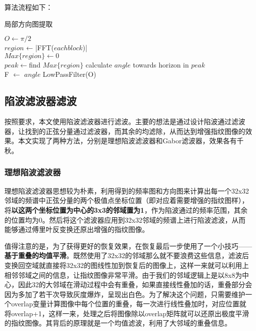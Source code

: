 \documentclass[UTF8]{ctexart}
\begin{document}
算法流程如下：

\begin{algorithm}[H]
    \caption{局部方向图提取}
    {
        $O \leftarrow \pi/2$\\
        $region$ ← |FFT($eachblock$)|\\
        $Max\{region\} \leftarrow  0$ \\
        {
            $peak \leftarrow $find $Max\{region\}$
        }
        calculate $angle$ towards horizon in $peak$ \\
        F $\leftarrow$ $angle$
    }
    LowPassFilter(O)

\end{algorithm}

\subsection{陷波滤波器滤波}
按照要求，本文使用陷波滤波器进行滤波。主要的想法是通过设计陷波通过滤波器，让找到的正弦分量通过滤波器，而其余的均滤除，从而达到增强指纹图像的效果。本文实现了两种方法，分别是理想陷波滤波器和Gabor滤波器，效果各有千秋。

\subsubsection{理想陷波滤波器}
理想陷波滤波器思想较为朴素，利用得到的频率图和方向图来计算出每一个32x32邻域的频谱中正弦分量的两个极值点坐标位置（即对应着需要增强的指纹图样），将\textbf{以这两个坐标位置为中心的3x3的邻域置为1}，作为陷波通过的频率范围，其余的位置均为0。然后将这个滤波器应用到32x32邻域的频谱上进行陷波滤波，从而能够通过傅里叶反变换还原出增强的指纹图像。

值得注意的是，为了获得更好的恢复效果，在恢复最后一步使用了一个小技巧——\textbf{基于重叠的均值平滑}。既然使用了32x32的邻域那么就不要浪费这些信息，滤波后变换回空域就直接将32x32的图线性加到恢复后的图像上，这样一来就可以利用上相邻邻域之间的信息，让指纹图像非常平滑。由于我们的邻域逻辑上是以8x8为中心，因此32的大邻域在滑动过程中会有重叠，如果直接线性叠加的话，重叠部分会因为多加了若干次导致灰度爆炸，呈现出白色。为了解决这个问题，只需要维护一个overlap变量计算图像中每个位置的重叠，每一次进行线性叠加时，对应位置就将overlap+1，这样一来，处理之后将图像除以overlap矩阵就可以还原出极度平滑的指纹图像。其背后的原理就是一个均值滤波，利用了大邻域的重叠信息。
\end{document}
